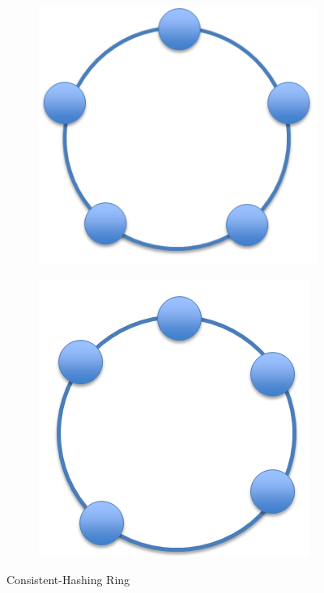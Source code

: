 \begin{figure}[htbp!]
	\centering
	\begin{subfigure}[c]{0.49\textwidth}
		\includegraphics[scale=0.5]{pics/uniformHashing.png}
		\label{fig:uniformHashing}
	\end{subfigure}
	\begin{subfigure}[c]{0.49\textwidth}
		\includegraphics[scale=0.5]{pics/adaptedHashing.png}
		\label{fig:adaptedHashing}
	\end{subfigure}
	\caption{Consistent-Hashing Ring}
\end{figure}

